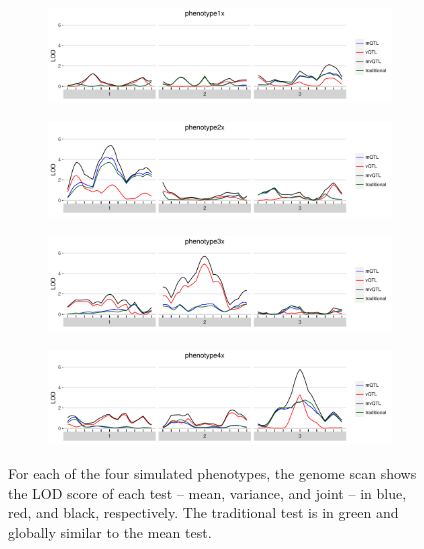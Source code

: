 \documentclass{article}
\begin{document}
\begin{figure}[ht!]
    \begin{subfigure}[b]{0.9\textwidth}
        \includegraphics[width=\textwidth]{images/LOD_scan_phenotype1x.pdf}
    \end{subfigure}

    \begin{subfigure}[b]{0.9\textwidth}
        \includegraphics[width=\textwidth]{images/LOD_scan_phenotype2x.pdf}
    \end{subfigure}

    \begin{subfigure}[b]{0.9\textwidth}
        \includegraphics[width=\textwidth]{images/LOD_scan_phenotype3x.pdf}
    \end{subfigure}

    \begin{subfigure}[b]{0.9\textwidth}
        \includegraphics[width=\textwidth]{images/LOD_scan_phenotype4x.pdf}
    \end{subfigure}

    \caption{For each of the four simulated phenotypes, the genome scan shows the LOD score of each test -- mean, variance, and joint -- in blue, red, and black, respectively.  The traditional test is in green and globally similar to the mean test. \label{fig:apdx_lod_score_scans}}
\end{figure}
\end{document}
